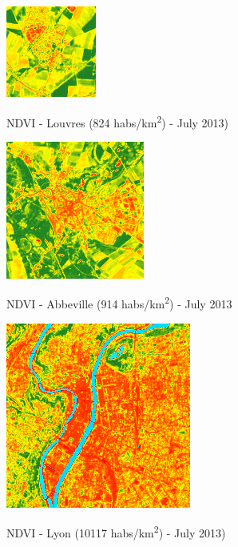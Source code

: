 \documentclass[c]{beamer}
\begin{document}
\begin{frame}
\begin{columns}
\begin{column}{0.25\textwidth}
  \begin{overlayarea}{\linewidth}{0.9cm}
  \centering\vfill
  \includegraphics[scale=0.17]{images/Louvres/07_ndvi.png}
  \end{overlayarea}
  \begin{overlayarea}{\linewidth}{0.5cm}
  \centering
  \tiny NDVI - Louvres (824 habs/km\textsuperscript{2}) - July 2013) \par
  \end{overlayarea}
  
  \begin{overlayarea}{\linewidth}{1.2cm}
  \centering\vfill
  \includegraphics[scale=0.17]{images/Abbeville/07_ndvi.png}
  \end{overlayarea}
  \begin{overlayarea}{\linewidth}{0.5cm}
  \centering
  \tiny NDVI - Abbeville (914 habs/km\textsuperscript{2}) - July 2013 \par
  \end{overlayarea}
  
  \begin{overlayarea}{\linewidth}{1.6cm}
  \centering\vfill
  \includegraphics[scale=0.17]{images/Lyon/07_ndvi.png}
  \end{overlayarea}
  \begin{overlayarea}{\linewidth}{0.5cm}
  \centering
  \tiny NDVI - Lyon (10117 habs/km\textsuperscript{2}) - July 2013) \par
  \end{overlayarea}  
 \end{column}

\end{columns}


\end{frame}
\end{document}
